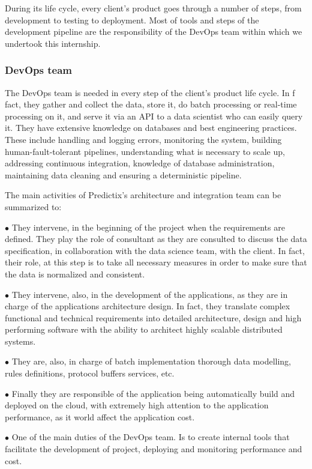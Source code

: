 During its life cycle, every client's product goes through a number of steps,
from development to testing to deployment. Most of tools and steps of the
development pipeline are the responsibility of the DevOps team within which we
undertook this internship.

\subsubsection{DevOps team}

The DevOps team is needed in every step of the client's product life cycle. In f
fact, they gather and collect the data, store it, do batch processing or
real-time processing on it, and serve it via an API to a data scientist who can
easily query it. They have extensive knowledge on databases and best
engineering practices. These include handling and logging errors, monitoring
the system, building human-fault-tolerant pipelines, understanding what is
necessary to scale up, addressing continuous integration, knowledge of database
administration, maintaining data cleaning and ensuring a deterministic
pipeline.

The main activities of Predictix's architecture and integration team can be
summarized to:

$\bullet$ They intervene, in the beginning of the project when the requirements are
defined. They play the role of consultant as they are consulted to discuss the
data specification, in collaboration with the data science team, with the
client. In fact, their role, at this step is to take all necessary measures in
order to make sure that the data is normalized and consistent.

$\bullet$ They intervene, also, in the development of the applications, as they are in
charge of the applications architecture design. In fact, they translate complex
functional and technical requirements into detailed architecture, design and
high performing software with the ability to architect highly scalable
distributed systems.

$\bullet$ They are, also, in charge of batch implementation thorough data modelling, rules
definitions, protocol buffers services, etc.

$\bullet$ Finally they are responsible of the application being automatically build and
deployed on the cloud, with extremely high attention to the application
performance, as it world affect the application cost.

$\bullet$ One of the main duties of the DevOps team. Is to create internal
tools that facilitate the development of project, deploying and monitoring
performance and cost.

